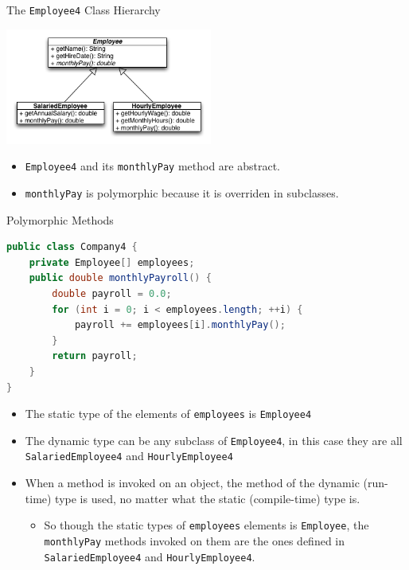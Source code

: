 \documentclass{beamer}
\begin{document}
\begin{frame}[fragile]{The {\tt Employee4} Class Hierarchy}

\begin{center}
\includegraphics[height=1.5in]{employee-uml.png}
\end{center}
\begin{itemize}
\item {\tt Employee4} and its {\tt monthlyPay} method are abstract.
\item {\tt monthlyPay} is polymorphic because it is overriden in subclasses.
\end{itemize}
\end{frame}

\begin{frame}[fragile]{Polymorphic Methods}

\vspace{-.05in}
\begin{lstlisting}[language=Java]
public class Company4 {
    private Employee[] employees;
    public double monthlyPayroll() {
        double payroll = 0.0;
        for (int i = 0; i < employees.length; ++i) {
            payroll += employees[i].monthlyPay();
        }
        return payroll;
    }
}
\end{lstlisting}
\vspace{-.1in}
\begin{itemize}
\item The static type of the elements of {\tt employees} is {\tt Employee4}
\item The dynamic type can be any subclass of {\tt Employee4}, in this case they are all {\tt SalariedEmployee4} and {\tt HourlyEmployee4}
\item When a method is invoked on an object, the method of the dynamic (run-time) type is used, no matter what the static (compile-time) type is.
\begin{itemize}
\item So though the static types of {\tt employees} elements is {\tt Employee}, the {\tt monthlyPay} methods invoked on them are the ones defined in {\tt SalariedEmployee4} and {\tt HourlyEmployee4}.
\end{itemize}
\end{itemize}
\end{frame}
\end{document}
